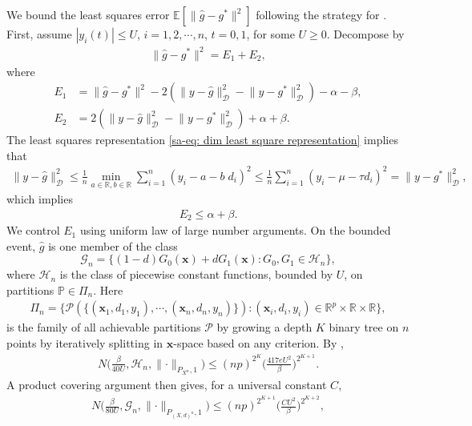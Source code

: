 \documentclass[10pt]{article}
\def\bx{\mathbf{x}}
\def\E{\mathbb{E}}
\def\P{\mathbb{P}}
\def\reals{\mathbb{R}}
\def\G{\mathcal{G}}
\def\dataD{\mathcal{D}}
\def\partitionP{\mathcal{P}}
\def\scrH{\mathscr{H}}
\theoremstyle{definition}
\theoremstyle{remark}
\begin{document}
We bound the least squares error $\E[\lVert \hat{g} - g^{\ast}\rVert^2]$ following the strategy for \cite[Theorem 4.3]{klusowski2024large}. First, assume $|y_i(t)| \leq U$, $i = 1,2, \cdots, n$, $t = 0,1$, for some $U \geq 0$. Decompose by
\begin{align*}
    \lVert \hat{g} - g^{\ast}\rVert^2 = E_1 + E_2,
\end{align*}
where
\begin{align*}
    E_1 & = \lVert \hat{g} - g^{\ast}\rVert^2 - 2 (\lVert y - \hat{g} \rVert_{\dataD}^2 - \lVert y - g^{\ast}\rVert_{\dataD}^2) - \alpha - \beta, \\
    E_2 & =  2 (\lVert y - \hat{g} \rVert_{\dataD}^2 - \lVert y - g^{\ast}\rVert_{\dataD}^2) + \alpha + \beta.
\end{align*}
The least squares representation \eqref{sa-eq: dim least square representation} implies that
\begin{align}\label{sa-eq: empirical risk minimization}
    \lVert y - \hat{g}\rVert_{\dataD}^2 
    \leq \frac{1}{n}\min_{a \in \reals, b \in \reals} \sum_{i = 1}^n (y_i - a - b\; d_i)^2 
    \leq \frac{1}{n}\sum_{i = 1}^n (y_i-\mu-\tau d_i)^2
    = \lVert y - g^{\ast}\rVert_{\dataD}^2,
\end{align}
which implies
\begin{align*}
    E_2 \leq \alpha + \beta.
\end{align*}
We control $E_1$ using uniform law of large number arguments. On the bounded event, $\hat{g}$ is one member of the class
\[
    \G_{n}
    =
    \{(1-d)G_0(\bx)+dG_1(\bx):G_0,G_1\in\scrH_n\},
\]
where $\scrH_n$ is the class of piecewise constant functions, bounded by $U$, on partitions $\P \in \Pi_n$. Here 
\begin{align*}
    \Pi_n = \{\partitionP(\{(\bx_1,d_1,y_1), \cdots, (\bx_n, d_n, y_n)\}): (\bx_i, d_i, y_i) \in \reals^p \times \reals \times \reals\},
\end{align*}
is the family of all achievable partitions $\partitionP$ by growing a depth $K$ binary tree on $n$ points by iteratively splitting in $\bx$-space based on any criterion. By \cite[Equation B.33]{klusowski2024large}, 
\begin{align*}
    N \bigg(\frac{\beta}{40 U}, \scrH_n, \lVert \cdot \rVert_{P_{X^n}, 1} \bigg) \leq (n p)^{2^K} \bigg(\frac{417 e U^2}{\beta}\bigg)^{2^{K+1}}.
\end{align*}
A product covering argument then gives, for a universal constant $C$,
\begin{align*}
    N \bigg(\frac{\beta}{80 U}, \G_n, \lVert \cdot \rVert_{P_{(X,d)^n}, 1} \bigg)
    \leq (n p)^{2^{K+1}} \bigg(\frac{C U^2}{\beta}\bigg)^{2^{K+2}},
\end{align*}
\end{document}
